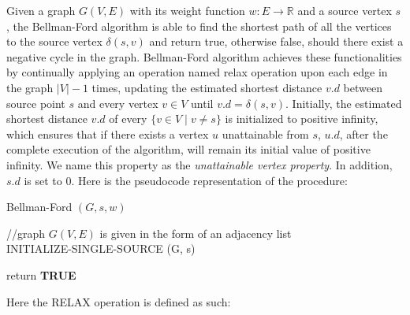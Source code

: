 \documentclass[12pt]{article}
\begin{document}
\hspace*{\fill} %

Given a graph $G(V, E)$ with its weight function $w: E \rightarrow \mathbb{R}$ and a source vertex $s$, the Bellman-Ford algorithm is able to find the shortest path of all the vertices to the source vertex $\delta(s, v)$ and return true, otherwise false, should there exist a negative cycle in the graph. Bellman-Ford algorithm achieves these functionalities by continually applying an operation named relax operation upon each edge in the graph $|V|-1$ times, updating the estimated shortest distance $v.d$ between source point $s$ and every vertex $v \in V$ until $v.d = \delta (s, v)$. Initially, the estimated shortest distance $v.d$ of every $\{v \in V \mid v \neq s\}$ is initialized to positive infinity, which ensures that if there exists a vertex $u$ unattainable from $s$, $u.d$, after the complete execution of the algorithm, will remain its initial value of positive infinity. We name this property as the \textit{unattainable vertex property}. In addition, $s.d$ is set to 0. Here is the pseudocode representation of the procedure:

\begin{algorithm}[H]
    \SetAlgoLined %
	\caption{Bellman-Ford $(G, s, w)$}%

	//graph $G(V, E)$ is given in the form of an adjacency list\\ %

    INITIALIZE-SINGLE-SOURCE (G, s) \\


	return \textbf{TRUE}

\end{algorithm}


$\,$\\
Here the RELAX operation is defined as such:\\
\end{document}
